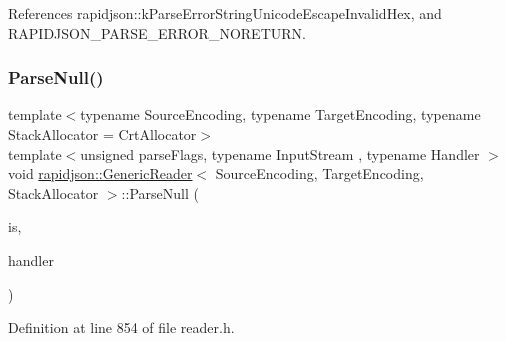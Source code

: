 References rapidjson\+::k\+Parse\+Error\+String\+Unicode\+Escape\+Invalid\+Hex, and R\+A\+P\+I\+D\+J\+S\+O\+N\+\_\+\+P\+A\+R\+S\+E\+\_\+\+E\+R\+R\+O\+R\+\_\+\+N\+O\+R\+E\+T\+U\+RN.

\mbox{\label{classrapidjson_1_1_generic_reader_a369a2bce1f2ee28dee935aa40603080f}} 
\subsubsection{\texorpdfstring{ParseNull()}{ParseNull()}}
{\footnotesize\ttfamily template$<$typename Source\+Encoding, typename Target\+Encoding, typename Stack\+Allocator = Crt\+Allocator$>$ \\
template$<$unsigned parse\+Flags, typename Input\+Stream , typename Handler $>$ \\
void \mbox{\hyperlink{classrapidjson_1_1_generic_reader}{rapidjson\+::\+Generic\+Reader}}$<$ Source\+Encoding, Target\+Encoding, Stack\+Allocator $>$\+::Parse\+Null (\begin{DoxyParamCaption}\item[{Input\+Stream \&}]{is,  }\item[{\mbox{\hyperlink{classrapidjson_1_1_handler}{Handler}} \&}]{handler }\end{DoxyParamCaption})\hspace{0.3cm}{\ttfamily [private]}}



Definition at line 854 of file reader.\+h.



